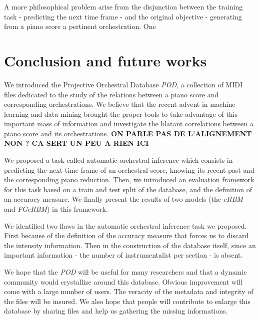 \documentclass[twoside,twocolumn]{article}
\begin{document}
A more philosophical problem arise from the disjunction between the training task - predicting the next time frame - and the original objective - generating from a piano score a pertinent orchestration. One 


\section{Conclusion and future works}
We introduced the Projective Orchestral Database \textit{POD}, a collection of MIDI files dedicated to the study of the relations between a piano score and corresponding orchestrations. We believe that the recent advent in machine learning and data mining brought the proper tools to take advantage of this important mass of information and investigate the blatant correlations between a piano score and its orchestrations.
\textbf{ON PARLE PAS DE L'ALIGNEMENT NON ? CA SERT UN PEU A RIEN ICI}

We proposed a task called automatic orchestral inference which consists in predicting the next time frame of an orchestral score, knowing its recent past and the corresponding piano reduction.
Then, we introduced an evaluation framework for this task based on a train and test split of the database, and the definition of an accuracy measure.
We finally present the results of two models (the \textit{cRBM} and \textit{FGcRBM}) in this framework.

We identified two flaws in the automatic orchestral inference task we proposed. First because of the definition of the accuracy measure that forces us to discard the intensity information. Then in the construction of the database itself, since an important information - the number of instrumentalist per section - is absent.

We hope that the \textit{POD} will be useful for many researchers and that a dynamic community would crystallize around this database. Obvious improvement will come with a large number of users. The veracity of the metadata and integrity of the files will be insured. We also hope that people will contribute to enlarge this database by sharing files and help us gathering the missing informations.




\end{document}

